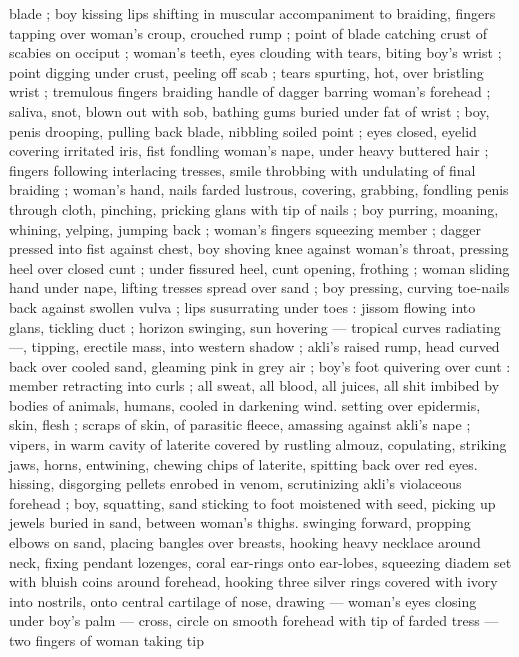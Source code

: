blade ; boy kissing lips shifting in muscular accompaniment to 
braiding, fingers tapping over woman's croup, crouched rump ; point 
of blade catching crust of scabies on occiput ; woman's teeth, eyes 
clouding with tears, biting boy's wrist ; point digging under crust, 
peeling off scab ; tears spurting, hot, over bristling wrist ; tremulous 
fingers braiding handle of dagger barring woman's forehead ; saliva, 
snot, blown out with sob, bathing gums buried under fat of wrist ; 
boy, penis drooping, pulling back blade, nibbling soiled point ; eyes 
closed, eyelid covering irritated iris, fist fondling woman's nape, 
under heavy buttered hair ; fingers following interlacing tresses, 
smile throbbing with undulating of final braiding ; woman's hand, 
nails farded lustrous, covering, grabbing, fondling penis through 
cloth, pinching, pricking glans with tip of nails ; boy purring, 
moaning, whining, yelping, jumping back ; woman's fingers 
squeezing member ; dagger pressed into fist against chest, boy 
shoving knee against woman's throat, pressing heel over closed cunt 
; under fissured heel, cunt opening, frothing ; woman sliding hand 
under nape, lifting tresses spread over sand ; boy pressing, curving 
toe-nails back against swollen vulva ; lips susurrating under toes : 
jissom flowing into glans, tickling duct ; horizon swinging, sun 
hovering --- tropical curves radiating ---, tipping, erectile mass, into 
western shadow ; akli's raised rump, head curved back over cooled 
sand, gleaming pink in grey air ; boy's foot quivering over cunt : 
member retracting into curls ; all sweat, all blood, all juices, all shit 
imbibed by bodies of animals, humans, cooled in darkening wind. 
setting over epidermis, skin, flesh ; scraps of skin, of parasitic 
fleece, amassing against akli's nape ; vipers, in warm cavity of 
laterite covered by rustling almouz, copulating, striking jaws, horns, 
entwining, chewing chips of laterite, spitting back over red eyes. 
hissing, disgorging pellets enrobed in venom, scrutinizing akli's 
violaceous forehead ; boy, squatting, sand sticking to foot moistened 
with seed, picking up jewels buried in sand, between woman's thighs. 
swinging forward, propping elbows on sand, placing bangles over 
breasts, hooking heavy necklace around neck, fixing pendant 
lozenges, coral ear-rings onto ear-lobes, squeezing diadem set with 
bluish coins around forehead, hooking three silver rings covered with 
ivory into nostrils, onto central cartilage of nose, drawing --- 
woman's eyes closing under boy's palm --- cross, circle on smooth 
forehead with tip of farded tress --- two fingers of woman taking tip 
